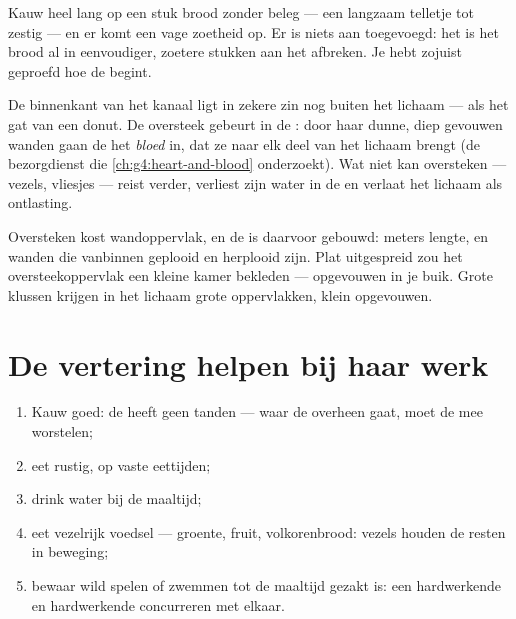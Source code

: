 \begin{example}\label{ex:g4:journey-of-food:sweet}
Kauw heel lang op een stuk brood zonder beleg --- een langzaam telletje
tot zestig --- en er komt een vage zoetheid op. Er is niets aan
toegevoegd: het  is het brood al in eenvoudiger, zoetere stukken
aan het afbreken. Je hebt zojuist geproefd hoe de  begint.
\end{example}

\begin{proposition}\label{prop:g4:journey-of-food:absorb}
De binnenkant van het kanaal ligt in zekere zin nog buiten het lichaam
--- als het gat van een donut. De oversteek gebeurt in de \emph{}: door haar dunne, diep gevouwen wanden gaan de 
het \emph{bloed} in, dat ze naar elk deel van het lichaam
brengt (de bezorgdienst die \cref{ch:g4:heart-and-blood} onderzoekt).
Wat niet kan oversteken --- vezels, vliesjes --- reist verder, verliest
zijn water in de  en verlaat het lichaam als ontlasting.
\end{proposition}
\admitted

\begin{remark}\label{rem:g4:journey-of-food:surface}
Oversteken kost wandoppervlak, en de  is daarvoor gebouwd:
meters lengte, en wanden die vanbinnen geplooid en herplooid zijn. Plat
uitgespreid zou het oversteekoppervlak een kleine kamer bekleden ---
opgevouwen in je buik. Grote klussen krijgen in het lichaam grote
oppervlakken, klein opgevouwen.
\end{remark}

\section{De vertering helpen bij haar werk}

\begin{method}\label{met:g4:journey-of-food:habits}
\begin{enumerate}
  \item Kauw goed: de  heeft geen tanden --- waar de 
        overheen gaat, moet de  mee worstelen;
  \item eet rustig, op vaste eettijden;
  \item drink water bij de maaltijd;
  \item eet vezelrijk voedsel --- groente, fruit, volkorenbrood: vezels
        houden de resten in beweging;
  \item bewaar wild spelen of zwemmen tot de maaltijd gezakt is: een
        hardwerkende  en hardwerkende  concurreren met elkaar.
\end{enumerate}
\end{method}

